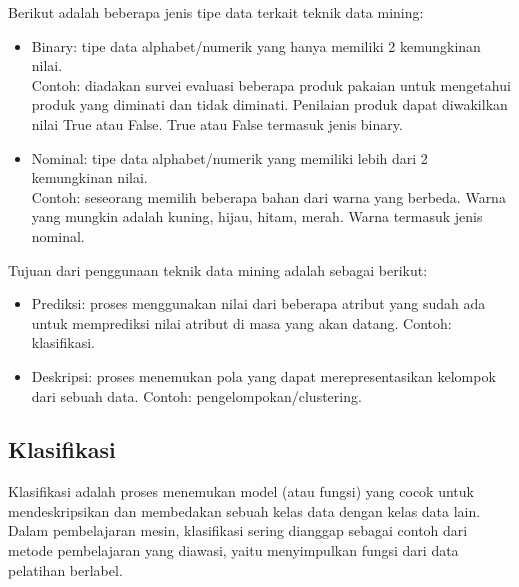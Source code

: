 \noindent Berikut adalah beberapa jenis tipe data terkait teknik data mining:

\begin{itemize}

\item Binary: tipe data alphabet/numerik yang hanya memiliki 2 kemungkinan nilai.\\
Contoh: diadakan survei evaluasi beberapa produk pakaian untuk mengetahui produk yang diminati dan tidak diminati. Penilaian produk dapat diwakilkan nilai True atau False. True atau False termasuk jenis binary.

\item Nominal: tipe data alphabet/numerik yang memiliki lebih dari 2 kemungkinan nilai.\\
Contoh: seseorang memilih beberapa bahan dari warna yang berbeda. Warna yang mungkin adalah kuning, hijau, hitam, merah. Warna termasuk jenis nominal.

\end{itemize}

\noindent Tujuan dari penggunaan teknik data mining adalah sebagai berikut:

\begin{itemize}

\item Prediksi: proses menggunakan nilai dari beberapa atribut yang sudah ada untuk memprediksi nilai atribut di masa yang akan datang. Contoh: klasifikasi.

\item Deskripsi: proses menemukan pola yang dapat merepresentasikan kelompok dari sebuah data. Contoh: pengelompokan/clustering.

\end{itemize}

\subsection{Klasifikasi} 
Klasifikasi adalah proses menemukan model (atau fungsi) yang cocok untuk mendeskripsikan dan membedakan sebuah kelas data dengan kelas data lain. Dalam pembelajaran mesin, klasifikasi sering dianggap sebagai contoh dari metode pembelajaran yang diawasi, yaitu menyimpulkan fungsi dari data pelatihan berlabel. \\


